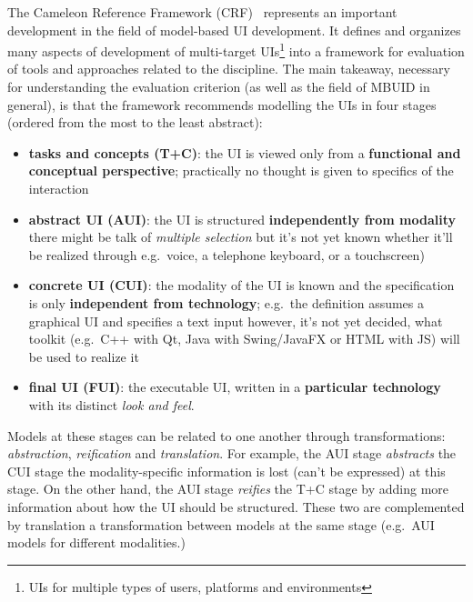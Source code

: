 The Cameleon Reference Framework (CRF)~\cite{calvary_cameleon_framework_2002, calvary_cameleon_glossary_2002} represents an important development in the field of model-based UI development.
It defines and organizes many aspects of development of multi-target UIs\footnote{UIs for multiple types of users, platforms and environments} into a framework for evaluation of tools and approaches related to the discipline.
The main takeaway, necessary for understanding the evaluation criterion (as well as the field of MBUID in general), is that the framework recommends modelling the UIs in four stages (ordered from the most to the least abstract):
\begin{itemize}
    \item \textbf{tasks and concepts (T+C)}: the UI is viewed only from a \textbf{functional and conceptual perspective};
          practically no thought is given to specifics of the interaction
    \item \textbf{abstract UI (AUI)}: the UI is structured \textbf{independently from modality}\,\textemdash\,there might be talk of \emph{multiple selection} but it's not yet known whether it'll be realized through e.g.\ voice, a telephone keyboard, or a touchscreen)
    \item \textbf{concrete UI (CUI)}: the modality of the UI is known and the specification is only \textbf{independent from technology};
          e.g.\ the definition assumes a graphical UI and specifies a text input\,\textemdash\,however, it's not yet decided, what toolkit (e.g.\ C++ with Qt, Java with Swing/JavaFX or HTML with JS) will be used to realize it
    \item \textbf{final UI (FUI)}: the executable UI, written in a \textbf{particular technology} with its distinct \emph{look and feel}.
\end{itemize}

Models at these stages can be related to one another through transformations: \emph{abstraction}, \emph{reification} and \emph{translation}.
For example, the AUI stage \emph{abstracts} the CUI stage\,\textemdash\,the modality-specific information is lost (can't be expressed) at this stage.
On the other hand, the AUI stage \emph{reifies} the T+C stage by adding more information about how the UI should be structured.
These two are complemented by translation\,\textemdash\,a transformation between models at the same stage (e.g.\ AUI models for different modalities.)

